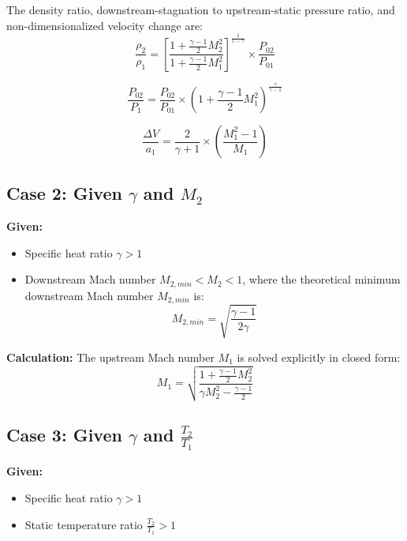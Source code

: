 The density ratio, downstream-stagnation to upstream-static pressure ratio, and non-dimensionalized velocity change are:
\begin{equation}
\frac{\rho_2}{\rho_1} = \left[\frac{1+\frac{\gamma-1}{2}M_2^2}{1+\frac{\gamma-1}{2}M_1^2}\right]^{\frac{1}{1-\gamma}} \times \frac{P_{02}}{P_{01}}
\end{equation}

\begin{equation}
\frac{P_{02}}{P_1} = \frac{P_{02}}{P_{01}} \times \left(1+\frac{\gamma-1}{2}M_1^2\right)^{\frac{\gamma}{\gamma-1}}
\end{equation}

\begin{equation}
\frac{\Delta V}{a_1} = \frac{2}{\gamma+1}\times\left(\frac{M_1^2-1}{M_1}\right)
\end{equation}


\subsection*{Case 2: Given $\gamma$ and $M_2$}

\textbf{Given:}
\begin{itemize}[nosep]
    \item Specific heat ratio $\gamma > 1$
    \item Downstream Mach number $M_{2,min} < M_2 < 1$, where the theoretical minimum downstream Mach number $M_{2,min}$ is:
    \begin{equation}
    M_{2,min} = \sqrt{\frac{\gamma-1}{2\gamma}}
    \end{equation}
\end{itemize}

\textbf{Calculation:} The upstream Mach number $M_1$ is solved explicitly in closed form:
\begin{equation}
M_1 = \sqrt{\frac{1+\frac{\gamma-1}{2}M_2^2}{\gamma M_2^2 - \frac{\gamma-1}{2}}}
\end{equation}


\subsection*{Case 3: Given $\gamma$ and $\frac{T_2}{T_1}$}

\textbf{Given:}
\begin{itemize}[nosep]
    \item Specific heat ratio $\gamma > 1$
    \item Static temperature ratio $\frac{T_2}{T_1} > 1$
\end{itemize}

